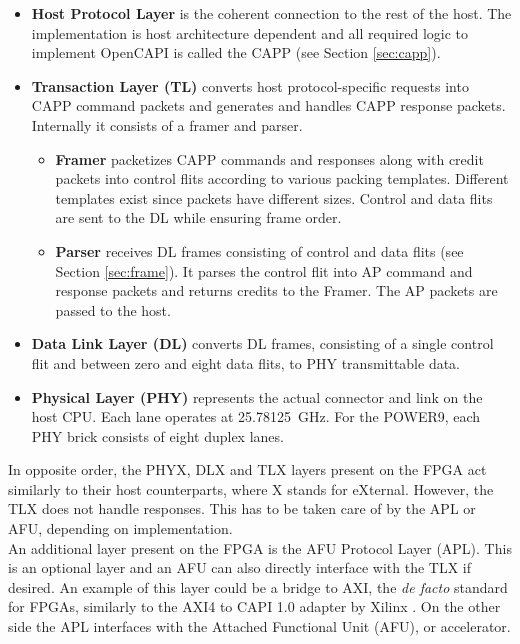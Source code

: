 \begin{itemize}
  \item{\textbf{Host Protocol Layer} is the coherent connection to the rest of the host. The implementation is host architecture dependent and all required logic to implement OpenCAPI is called the CAPP (see Section \ref{sec:capp}).}
  \item{\textbf{Transaction Layer (TL)} converts host protocol-specific requests into CAPP command packets and generates and handles CAPP response packets. Internally it consists of a framer and parser.
  \begin{itemize}
    \item{\textbf{Framer} packetizes CAPP commands and responses along with credit packets into control flits according to various packing templates. Different templates exist since packets have different sizes. Control and data flits are sent to the DL while ensuring frame order.}
    \item{\textbf{Parser} receives DL frames consisting of control and data flits (see Section \ref{sec:frame}). It parses the control flit into AP command and response packets and returns credits to the Framer. The AP packets are passed to the host.}
  \end{itemize}
  }
  \item{\textbf{Data Link Layer (DL)} converts DL frames, consisting of a single control flit and between zero and eight data flits, to PHY transmittable data.}
  \item{\textbf{Physical Layer (PHY)} represents the actual connector and link on the host CPU. Each lane operates at \SI{25.78125}{\giga\hertz}. For the POWER9, each PHY brick consists of eight duplex lanes.}
\end{itemize}

In opposite order, the PHYX, DLX and TLX layers present on the FPGA act similarly to their host counterparts, where X stands for eXternal. However, the TLX does not handle responses. This has to be taken care of by the APL or AFU, depending on implementation.\\
An additional layer present on the FPGA is the AFU Protocol Layer (APL). This is an optional layer and an AFU can also directly interface with the TLX if desired. An example of this layer could be a bridge to AXI, the \textit{de facto} standard for FPGAs, similarly to the AXI4 to CAPI 1.0 adapter by Xilinx \cite{xilinx-xapp1293}. On the other side the APL interfaces with the Attached Functional Unit (AFU), or accelerator.


